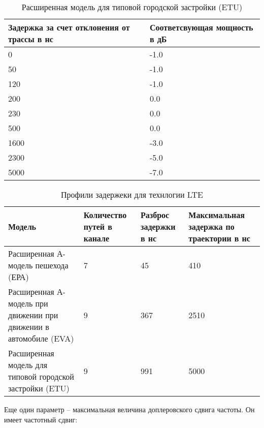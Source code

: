 \begin{table} [htb]
  \centering
\parbox{15cm}{\caption{Расширенная модель для типовой городской застройки (ETU) \cite{TS36104}}\label{ETU}}
\begin{tabular}{|l|l|}
    \hline
    \hline
    Задержка за счет отклонения от трассы в нс &  Соответсвующая мощность в дБ \\ \hline \hline
    0    & -1.0 \\ \hline
    50   & -1.0 \\ \hline
    120  & -1.0 \\ \hline
    200  & 0.0  \\ \hline
    230  & 0.0  \\ \hline
    500  & 0.0  \\ \hline
    1600 & -3.0 \\ \hline
    2300 & -5.0 \\ \hline
    5000 & -7.0 \\ \hline
    \end{tabular}
\end{table}



\begin{table} [htb]
  \centering
\parbox{15cm}{\caption{Профили задержеки для технлогии LTE \cite{iks}}\label{ProfileDelay}}
    \begin{tabular}{|p{5cm}|p{3cm}|p{3cm}|p{4cm}|}
    \hline \hline
    Модель                                                            &  Количество путей в канале &  Разброс задержки в нс &  Максимальная задержка по траектории в нс \\ \hline \hline
    Расширенная А-модель пешехода (ЕРА)                               & 7                          & 45                     & 410                                       \\ \hline
    Расширенная А-модель при движении при движении в автомобиле (EVA) & 9                          & 367                    & 2510                                      \\ \hline
    Расширенная модель для типовой городской застройки (ETU)          & 9                          & 991                    & 5000                                      \\ \hline
    \end{tabular}
\end{table}



Еще один параметр – максимальная величина доплеровского сдвига частоты. Он имеет частотный сдвиг:

